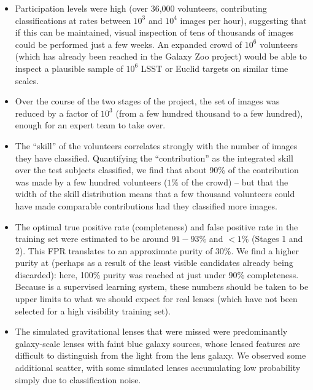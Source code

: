 \documentclass[useAMS,usenatbib,a4paper]{mn2e}
\begin{document}
\begin{itemize}

\item Participation levels were high (over 36,000 volunteers, contributing
classifications at rates between $10^3$ and $10^4$ images per hour), suggesting
that if this can be maintained, visual inspection of tens of thousands of images
could be performed just a few weeks. An expanded crowd of $10^6$ volunteers
(which has already been reached in the Galaxy Zoo project) would
be able to inspect a plausible sample of $10^6$ LSST or Euclid targets
on similar time scales.

\item Over the course of the two stages of the \cfhtls project, the
set of images was reduced by a factor of $10^3$ (from a few hundred thousand to
a few hundred), enough for an expert team to take over.

\item The ``skill'' of the volunteers correlates strongly with the number of
images they have classified.  Quantifying the ``contribution'' as the integrated
skill over the test subjects classified, we find that about 90\% of the
contribution was made by a few hundred volunteers ($1\%$ of the crowd) -- but
that the width of the skill distribution means that a  few thousand volunteers
could have made comparable contributions had they classified more images.

\item The optimal true positive rate (completeness) and false positive rate in
the training set were estimated to be around $91-93\%$ and $<1\%$ (Stages 1 and
2). This FPR translates to an approximate purity of 30\%. We find a
higher purity at \StageTwo (perhaps as a result of the least visible candidates already
being discarded): here, 100\% purity was reached at just under $90\%$
completeness. Because \SW is a supervised learning system, these numbers should
be taken to be upper limits to what we should expect for real lenses (which have
not been selected for a high visibility training set).

\item The simulated gravitational lenses that were missed were predominantly
galaxy-scale lenses with faint blue galaxy sources, whose lensed features are
difficult to distinguish from the light from the lens galaxy. We observed some
additional scatter, with some simulated lenses accumulating low probability
simply due to classification noise.

\end{itemize}
\end{document}
